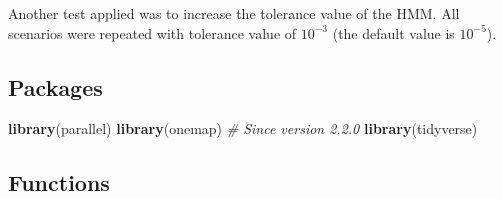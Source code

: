 \documentclass[]{article}
\newenvironment{Shaded}{\begin{snugshade}}{\end{snugshade}}
\newcommand{\CommentTok}[1]{\textcolor[rgb]{0.56,0.35,0.01}{\textit{#1}}}
\newcommand{\KeywordTok}[1]{\textcolor[rgb]{0.13,0.29,0.53}{\textbf{#1}}}
\newcommand{\NormalTok}[1]{#1}
\begin{document}
Another test applied was to increase the tolerance value of the HMM. All
scenarios were repeated with tolerance value of \(10^{-3}\) (the default
value is \(10^{-5}\)).

\hypertarget{packages}{%
\subsection{Packages}\label{packages}}

\begin{Shaded}
\begin{Highlighting}[]
\KeywordTok{library}\NormalTok{(parallel)}
\KeywordTok{library}\NormalTok{(onemap) }\CommentTok{# Since version 2.2.0}
\KeywordTok{library}\NormalTok{(tidyverse)}
\end{Highlighting}
\end{Shaded}

\hypertarget{functions}{%
\subsection{Functions}\label{functions}}
\end{document}
